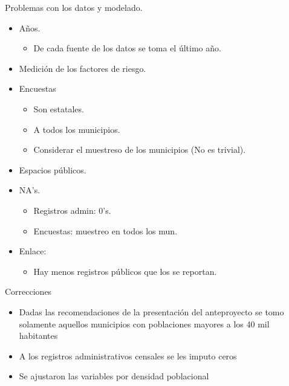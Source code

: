 \documentclass[ignorenonframetext,]{beamer}
\begin{document}
\begin{frame}{Problemas con los datos y modelado.}

\begin{itemize}
\itemsep1pt\parskip0pt
\item
  Años.

  \begin{itemize}
  \itemsep1pt\parskip0pt
  \item
    De cada fuente de los datos se toma el último año.
  \end{itemize}
\item
  Medición de los factores de riesgo.
\item
  Encuestas

  \begin{itemize}
  \itemsep1pt\parskip0pt
  \item
    Son estatales.
  \item
    A todos los municipios.
  \item
    Considerar el muestreso de los municipios (No es trivial).
  \end{itemize}
\item
  Espacios públicos.
\item
  NA's.

  \begin{itemize}
  \itemsep1pt\parskip0pt
  \item
    Registros admin: 0's.
  \item
    Encuestas: muestreo en todos los mun.
  \end{itemize}
\item
  Enlace:

  \begin{itemize}
  \itemsep1pt\parskip0pt
  \item
    Hay menos registros públicos que los se reportan.
  \end{itemize}
\end{itemize}

\end{frame}

\begin{frame}{Correcciones}

\begin{itemize}
\itemsep1pt\parskip0pt
\item
  Dadas las recomendaciones de la presentación del anteproyecto se tomo
  solamente aquellos municipios con poblaciones mayores a los 40 mil
  habitantes
\item
  A los registros administrativos censales se les imputo ceros
\item
  Se ajustaron las variables por densidad poblacional
\end{itemize}

\end{frame}
\end{document}
